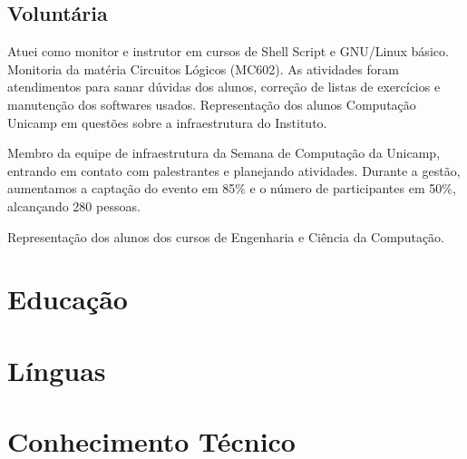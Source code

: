 \documentclass[10pt, a4paper, roman]{moderncv} %
\begin{document}
\subsection{Voluntária}
{
    Atuei como monitor e instrutor em cursos de Shell Script e GNU/Linux básico.
}
{
    Monitoria da matéria Circuitos Lógicos (MC602). As atividades foram atendimentos para sanar dúvidas 
    dos alunos, correção de listas de exercícios e manutenção dos softwares usados.
}
{
Representação dos alunos Computação Unicamp em questões sobre a 
    infraestrutura do Instituto.
}

{
Membro da equipe de infraestrutura da Semana de Computação da Unicamp, entrando em contato com palestrantes e planejando atividades.
Durante a gestão, aumentamos a captação do evento em 85\% e o número de participantes em 50\%, alcançando 280 pessoas.
}

{
Representação dos alunos dos cursos de Engenharia e Ciência da Computação.
}

\section{Educação}



\section{Línguas}

\section{Conhecimento Técnico}

\end{document}
